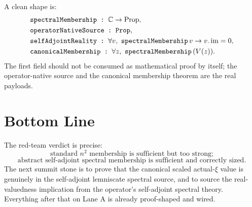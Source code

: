 \documentclass[11pt]{article}
\begin{document}
A clean shape is:
\[
\begin{aligned}
&\verb|spectralMembership : | \mathbb{C}\to\operatorname{Prop},\\
&\verb|operatorNativeSource : Prop|,\\
&\verb|selfAdjointReality : |
  \forall v,\ \verb|spectralMembership|\,v\to v.\operatorname{im}=0,\\
&\verb|canonicalMembership : |
  \forall z,\ \verb|spectralMembership|\,(V(z)).
\end{aligned}
\]
The first field should not be consumed as mathematical proof by itself; the
operator-native source and the canonical membership theorem are the real
payloads.

\section*{Bottom Line}

The red-team verdict is precise:
\[
  \text{standard \(n^2\) membership is sufficient but too strong;}
\]
\[
  \text{abstract self-adjoint spectral membership is sufficient and correctly sized.}
\]
The next summit stone is to prove that the canonical scaled actual-\(\xi\)
value is genuinely in the self-adjoint lemniscate spectral source, and to source
the real-valuedness implication from the operator's self-adjoint spectral
theory.  Everything after that on Lane A is already proof-shaped and wired.
\end{document}
